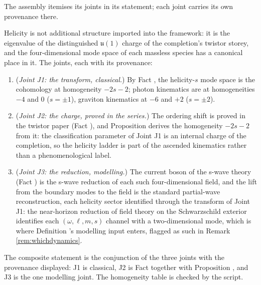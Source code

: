 The assembly itemises its joints in its statement; each joint carries its own provenance there.

Helicity is not additional structure imported into the framework: it is the eigenvalue of the distinguished $\mathfrak{u}(1)$ charge of the completion's twistor storey, and the four-dimensional mode space of each massless species has a canonical place in it. The joints, each with its provenance:
\begin{enumerate}
\item (\emph{Joint J1: the transform, classical.}) By Fact , the helicity-$s$ mode space is the cohomology at homogeneity $-2s-2$; photon kinematics are at homogeneities $-4$ and $0$ ($s = \pm1$), graviton kinematics at $-6$ and $+2$ ($s = \pm2$).
\item (\emph{Joint J2: the charge, proved in the series.}) The ordering shift is proved in the twistor paper (Fact ), and Proposition  derives the homogeneity $-2s-2$ from it: the classification parameter of Joint J1 is an internal charge of the completion, so the helicity ladder is part of the ascended kinematics rather than a phenomenological label.
\item (\emph{Joint J3: the reduction, modelling.}) The current boson of the s-wave theory (Fact ) is the s-wave reduction of each such four-dimensional field, and the lift from the boundary modes to the field is the standard partial-wave reconstruction, each helicity sector identified through the transform of Joint J1: the near-horizon reduction of field theory on the Schwarzschild exterior identifies each $(\omega, \ell, m, s)$ channel with a two-dimensional mode, which is where Definition 's modelling input enters, flagged as such in Remark \ref{rem:whichdynamics}.
\end{enumerate}
The composite statement is the conjunction of the three joints with the provenance displayed: J1 is classical, J2 is Fact  together with Proposition , and J3 is the one modelling joint. The homogeneity table is checked by the script.

